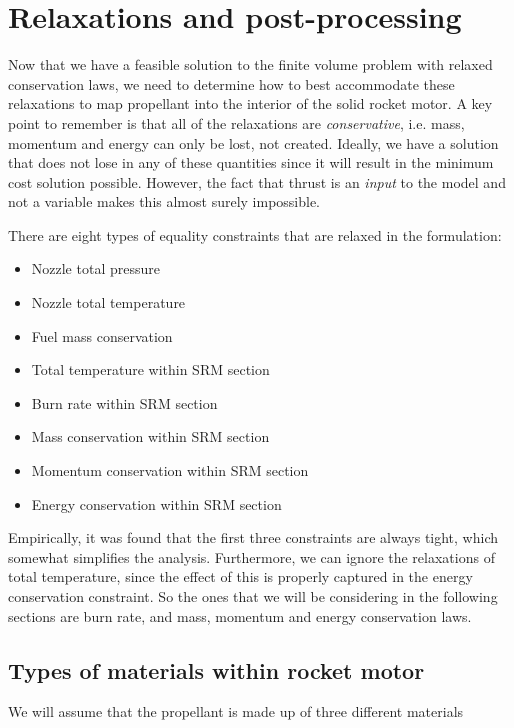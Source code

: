 \section{Relaxations and post-processing}
\label{sec:relaxations}

Now that we have a feasible solution to the finite volume problem
with relaxed conservation laws, we need to determine how to best
accommodate these relaxations to map propellant into the interior of
the solid rocket motor. A key point to remember is that all of the relaxations are \emph{conservative},
i.e. mass, momentum and energy can only be lost, not created. Ideally,
we have a solution that does not lose in any of these quantities since it will
result in the minimum cost solution possible. However, the fact that thrust is an \emph{input}
to the model and not a variable makes this almost surely impossible.

There are eight types of equality constraints that are relaxed in the formulation:
\begin{itemize}
    \item Nozzle total pressure
    \item Nozzle total temperature
    \item Fuel mass conservation
    \item Total temperature within SRM section
    \item Burn rate within SRM section
    \item Mass conservation within SRM section
    \item Momentum conservation within SRM section
    \item Energy conservation within SRM section
\end{itemize}

Empirically, it was found that the first three constraints are always tight, which
somewhat simplifies the analysis. Furthermore, we can ignore the relaxations of
total temperature, since the effect of this is properly captured in the energy conservation constraint.
So the ones that we will be considering in the following sections are burn rate, and
mass, momentum and energy conservation laws.

\subsection{Types of materials within rocket motor}

We will assume that the propellant is made up of three different materials

